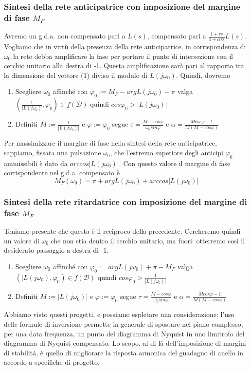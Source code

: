 \documentclass[11pt]{article}
\begin{document}
\subsubsection{Sintesi della rete anticipatrice con imposizione del margine di fase $M_F$}
Avremo un g.d.a. non compensato pari a $L(s)$, compensato pari a $\frac{1+\tau s}{1+\alpha\tau s} L(s)$. 
Vogliamo che in virtù della presenza della rete anticipatrice, in corrispondenza di $\omega_0$ la rete debba amplificare la fase per portare il punto di intersezione con il cerchio unitario alla destra di -1. Questa amplificazione sarà pari al rapporto tra la dimensione del vettore (1) diviso il modulo di $L(j\omega_0)$. Quindi, dovremo 
\begin{enumerate}
    \item Scegliere $\omega_0$ affinché con $\varphi_0 := M_F - argL(j\omega_0)-\pi$ valga $\left(\frac{1}{|L(j\omega_0)}, \varphi_0\right) \in f(\mathcal{D})$ quindi $cos\varphi_0 > |L(j\omega_0)|$
    \item Definiti $M:=\frac{1}{|L(j\omega_0)|}$ e $\varphi := \varphi_0$ segue $\tau = \frac{M-cos\varphi}{\omega_0 sin\varphi} $ e $\alpha=\frac{Mcos\varphi-1}{M(M-cos\varphi)}$
\end{enumerate}
Per massimizzare il margine di fase nella sintesi della rete anticipatrice, sappiamo, fissata una pulsazione $\omega_0$, che l'estremo superiore degli anticipi $\varphi_0$ ammissibili è dato da $arccos|L(j\omega_0)|$. Con questo valore il margine di fase corrispondente nel g.d.a. compensato è
\begin{displaymath}
    M_F(\omega_0) = \pi + argL(j\omega_0)+arccos|L(j\omega_0)|
\end{displaymath}
\subsubsection{Sintesi della rete ritardatrice con imposizione del margine di fase $M_F$}
Teniamo presente che questa è il reciproco della precedente. Cercheremo quindi un valore di $\omega_0$ che non stia dentro il cerchio unitario, ma fuori: otterremo così il desiderato passaggio a destra di -1. 
\begin{enumerate}
    \item Scegliere $\omega_0$ affinché con $\varphi_0 := argL(j\omega_0)+\pi - M_F$ valga $\left(|L(j\omega_0), \varphi_0\right) \in f(\mathcal{D})$ quindi $cos\varphi_0 > \frac{1}{|L(j\omega_0)|}$
    \item Definiti $M:=|L(j\omega_0)|$ e $\varphi := \varphi_0$ segue $\tau = \frac{M-cos\varphi}{\omega_0 sin\varphi} $ e $\alpha=\frac{Mcos\varphi-1}{M(M-cos\varphi)}$
\end{enumerate}
Abbiamo visto questi progetti, e possiamo espletare una considerazione: l'uso delle formule di inversione permette in generale di spostare nel piano complesso, per una data frequenza, un punto del diagramma di Nyquist in uno limitrofo del diagramma di Nyquist compensato. Lo scopo, al di là dell'imposizione di margini di stabilità, è quello di migliorare la risposta armonica del guadagno di anello in accordo a specifiche di progetto. 
\end{document}
